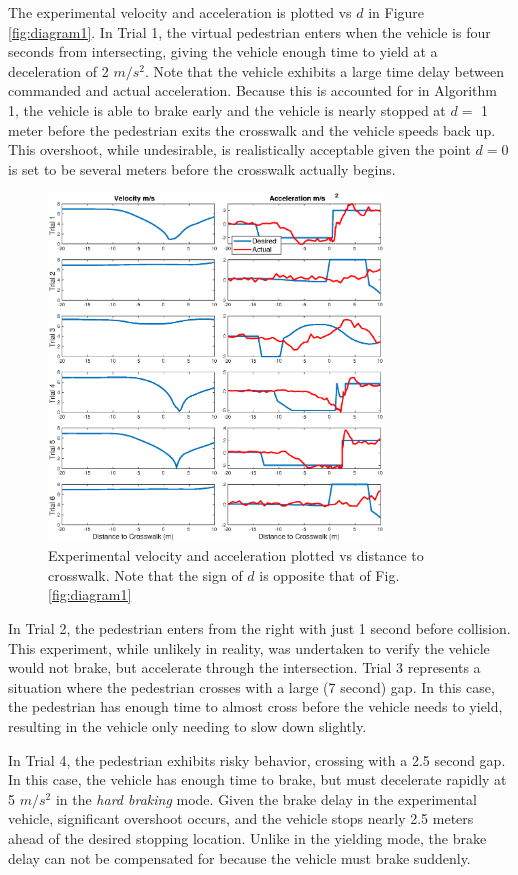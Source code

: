 \documentclass[letterpaper, 10 pt, conference]{ieeeconf}  %
\begin{document}
The experimental velocity and acceleration is plotted vs $d$ in 
Figure \ref{fig:diagram1}. In Trial 1, the virtual pedestrian enters when the vehicle is four seconds from intersecting, giving the vehicle enough time to yield at a deceleration of 2 $m/s^2$. Note that the vehicle exhibits a large time delay between commanded and actual acceleration. Because this is accounted for in Algorithm 1, the vehicle is able to brake early and the vehicle is nearly stopped at $d = $ 1 meter before the pedestrian exits the crosswalk and the vehicle speeds back up. This overshoot, while undesirable, is realistically acceptable given the point $d=0$ is set to be several meters before the crosswalk actually begins. 

\begin{figure}[h]
\centering
\includegraphics[width=3.5in]{figures/expPlot.eps}
\caption{Experimental velocity and acceleration plotted vs distance to crosswalk. Note that the sign of $d$ is opposite that of Fig.\ref{fig:diagram1}}
\label{fig:g80}
\end{figure}

In Trial 2, the pedestrian enters from the right with just 1 second before collision. This experiment, while unlikely in reality, was undertaken to verify the vehicle would not brake, but accelerate through the intersection. Trial 3 represents a situation where the pedestrian crosses with a large (7 second) gap. In this case, the pedestrian has enough time to almost cross before the vehicle needs to yield, resulting in the vehicle only needing to slow down slightly. 

In Trial 4, the pedestrian exhibits risky behavior, crossing with a 2.5 second gap. In this case, the vehicle has enough time to brake, but must decelerate rapidly at 5 $m/s^2$ in the \textit{hard braking} mode. Given the brake delay in the experimental vehicle, significant overshoot occurs, and the vehicle stops nearly 2.5 meters ahead of the desired stopping location. Unlike in the yielding mode, the brake delay can not be compensated for because the vehicle must brake suddenly. 
\end{document}

